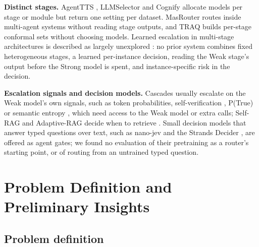 \documentclass{article}
\begin{document}
\textbf{Distinct stages.} AgentTTS \citep{wang2025agenttts}, LLMSelector \citep{chen2025llmselector} and Cognify \citep{he2025cognify} allocate models per stage or module but return one setting per dataset. MasRouter \citep{yue2025masrouter} routes inside multi-agent systems without reading stage outputs, and TRAQ \citep{li2024traq} builds per-stage conformal sets without choosing models. Learned escalation in multi-stage architectures is described as largely unexplored \citep{routingsurvey2026}: no prior system combines fixed heterogeneous stages, a learned per-instance decision, reading the Weak stage's output before the Strong model is spent, and instance-specific risk in the decision.

\textbf{Escalation signals and decision models.} Cascades usually escalate on the Weak model's own signals, such as token probabilities, self-verification \citep{chen2023frugalgpt,aggarwal2024automix}, P(True) \citep{kadavath2022know} or semantic entropy \citep{farquhar2024semantic}, which need access to the Weak model or extra calls; Self-RAG and Adaptive-RAG decide when to retrieve \citep{asai2024selfrag,jeong2024adaptiverag}. Small decision models that answer typed questions over text, such as nano-jev \citep{nanojev2026} and the Strands Decider \citep{strandsdecider2026}, are offered as agent gates; we found no evaluation of their pretraining as a router's starting point, or of routing from an untrained typed question.

\section{Problem Definition and Preliminary Insights}
\label{sec:insights}

\subsection{Problem definition}
\label{sec:problem}
\end{document}
